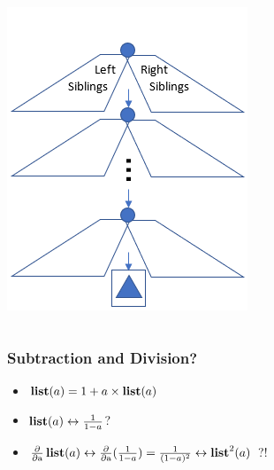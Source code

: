 \begin{frame}
\begin{columns}
\begin{column}{0.4\textwidth}
\centering
\includegraphics[width=\textwidth]{figure/zipper_rev}
\end{column}
\end{columns}
\end{frame}

\begin{frame}
\frametitle{Subtraction and Division?}

\begin{itemize}[<+->]
\item $\operatorname{\textbf{list}}(a) = 1 + a \times \operatorname{\textbf{list}}(a)$
\item $\operatorname{\textbf{list}}(a) \leftrightarrow \frac{1}{1-a}$?
\item $\operatorname{\frac{\partial}{\partial a}}\operatorname{\textbf{list}}(a) \leftrightarrow \operatorname{\frac{\partial}{\partial a}}(\frac{1}{1-a})
= \frac{1}{(1-a)^2} \leftrightarrow \operatorname{\textbf{list}}^2(a)$ ?!
\end{itemize}
\end{frame}
